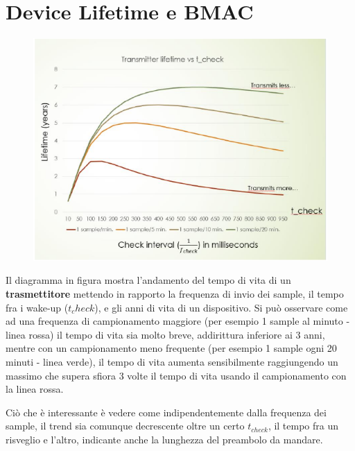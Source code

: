 \section{Device Lifetime e BMAC}

\begin{figure}[htbp]
   \centering
   \includegraphics{images/questions/Schermata del 2023-10-20 11-37-09.png}
   \label{fig:dom19}
\end{figure}

Il diagramma in figura mostra l'andamento del tempo di vita di un \textbf{trasmettitore} mettendo in rapporto la frequenza di invio dei sample, il tempo fra i wake-up ($t_check$), e gli anni di vita di un dispositivo. Si può osservare come ad una frequenza di campionamento maggiore (per esempio 1 sample al minuto - linea rossa) il tempo di vita sia molto breve, addirittura inferiore ai 3 anni, mentre con un campionamento meno frequente (per esempio 1 sample ogni 20 minuti - linea verde), il tempo di vita aumenta sensibilmente raggiungendo un massimo che supera sfiora 3 volte il tempo di vita usando il campionamento con la linea rossa.

Ciò che è interessante è vedere come indipendentemente dalla frequenza dei sample, il trend sia comunque decrescente oltre un certo $t_{check}$, il tempo fra un risveglio e l'altro, indicante anche la lunghezza del preambolo da mandare.


